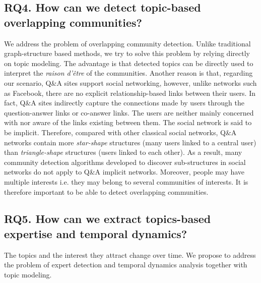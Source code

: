 \subsection*{RQ4. How can we detect topic-based overlapping communities?}
We address the problem of overlapping community detection. Unlike traditional graph-structure based methods, we try to solve this problem by relying directly on topic modeling. The advantage is that detected topics can be directly used to interpret the \textit{raison d'être} of the communities. Another reason is that, regarding our scenario, Q\&A sites support social networking, however, unlike networks such as Facebook, there are no explicit relationship-based links between their users. In fact, Q\&A sites indirectly capture the connections made by users through the question-answer links or co-answer links. The users are neither mainly concerned with nor aware of the links existing between them. The social network is said to be implicit. Therefore, compared with other classical social networks, Q\&A networks contain more \textit{star-shape} structures (many users linked to a central user) than \textit{triangle-shape} structures (users linked to each other). As a result, many community detection algorithms developed to discover sub-structures in social networks do not apply to Q\&A implicit networks. 
Moreover, people may have multiple interests i.e. they may belong to several communities of interests. It is therefore important to be able to detect overlapping communities. 

\subsection*{RQ5. How can we extract topics-based expertise and temporal dynamics?}
The topics and the interest they attract change over time. We propose to address the problem of expert detection and temporal dynamics analysis together with topic modeling. 



